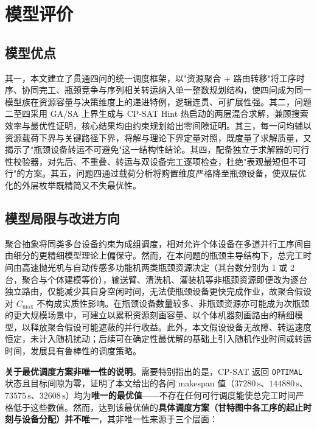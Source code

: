\documentclass[12pt,a4paper]{ctexart}
\begin{document}
\section{模型评价}
\subsection{模型优点}
其一，本文建立了贯通四问的统一调度框架，以"资源聚合 $+$ 路由转移"将工序时序、协同完工、瓶颈竞争与序列相关转运纳入单一整数规划结构，使四问成为同一模型族在资源容量与决策维度上的递进特例，逻辑连贯、可扩展性强。其二，问题二至四采用 GA/SA 上界生成与 CP-SAT Hint 热启动的两层混合求解，兼顾搜索效率与最优性证明，核心结果均由约束规划给出零间隙证明。其三，每一问均辅以资源载荷下界与关键路径下界，将解与理论下界定量对照，既度量了求解质量，又揭示了"瓶颈设备转运不可避免"这一结构性结论。其四，配备独立于求解器的可行性校验器，对先后、不重叠、转运与双设备完工逐项检查，杜绝"表观最短但不可行"的方案。其五，问题四通过载荷分析将购置维度严格降至瓶颈设备，使双层优化的外层枚举既精简又不失最优性。

\subsection{模型局限与改进方向}
聚合抽象将同类多台设备约束为成组调度，相对允许个体设备在多道并行工序间自由细分的更精细模型理论上偏保守。然而，在本问题的瓶颈主导结构下，总完工时间由高速抛光机与自动传感多功能机两类瓶颈资源决定（其台数分别为 1 或 2 台，聚合与个体建模等价），输送臂、清洗机、灌装机等非瓶颈资源即便改为逐台独立路由，仅能减少其自身空闲时间，无法使瓶颈设备更快完成作业，故聚合假设对 $C_{\max}$ 不构成实质性影响。在瓶颈设备数量较多、非瓶颈资源亦可能成为次瓶颈的更大规模场景中，可建立以累积资源刻画容量、以个体机器刻画路由的精细模型，以释放聚合假设可能遮蔽的并行收益。此外，本文假设设备无故障、转运速度恒定，未计入随机扰动；后续可在确定性最优解的基础上引入随机作业时间或转运时间，发展具有鲁棒性的调度策略。

\bigskip
\noindent\textbf{关于最优调度方案非唯一性的说明}。需要特别指出的是，CP-SAT 返回 \texttt{OPTIMAL} 状态且目标间隙为零，证明了本文给出的各问 makespan 值（$37280\,\mathrm{s}$、$144880\,\mathrm{s}$、$73575\,\mathrm{s}$、$32608\,\mathrm{s}$）均为\textbf{唯一的最优值}——不存在任何可行调度能使总完工时间严格低于这些数值。然而，达到该最优值的\textbf{具体调度方案（甘特图中各工序的起止时刻与设备分配）并不唯一}，其非唯一性来源于三个层面：
\end{document}
